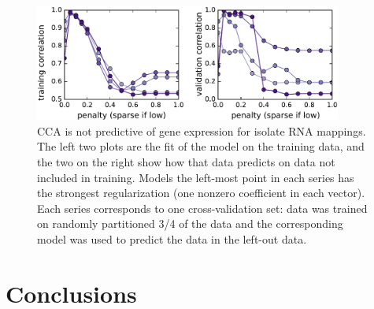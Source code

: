 \begin{figure}[H]
\centering
    \includegraphics[width=0.9\textwidth]{./tex/chapter3/figures/170324_CCA_not_so_good--cleaned.pdf}
    \begin{singlespace}
    \caption[CCA is not predictive of gene expression for isolate RNA mappings]{
        CCA is not predictive of gene expression for isolate RNA mappings.
        The left two plots are the fit of the model on the training data,
            and the two on the right show how that data predicts on data not included in training.
        Models the left-most point in each series has the strongest regularization (one nonzero coefficient in each vector).
        Each series corresponds to one cross-validation set:
            data was trained on randomly partitioned 3/4 of the data and the corresponding model was used to predict the data in the left-out data.
        }
    \label{fig:cca}
    \end{singlespace}
\end{figure}



\section{Conclusions}
